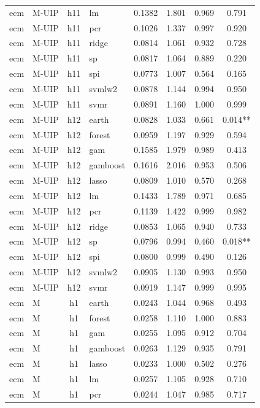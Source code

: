 \begin{ThreePartTable}
\begin{longtable}[t]{llclcccc}
ecm & M-UIP & h11 & lm & 0.1382 & 1.801 & 0.969 & 0.791\\
ecm & M-UIP & h11 & pcr & 0.1026 & 1.337 & 0.997 & 0.920\\
ecm & M-UIP & h11 & ridge & 0.0814 & 1.061 & 0.932 & 0.728\\
ecm & M-UIP & h11 & sp & 0.0817 & 1.064 & 0.889 & 0.220\\
ecm & M-UIP & h11 & spi & 0.0773 & 1.007 & 0.564 & 0.165\\
ecm & M-UIP & h11 & svmlw2 & 0.0878 & 1.144 & 0.994 & 0.950\\
ecm & M-UIP & h11 & svmr & 0.0891 & 1.160 & 1.000 & 0.999\\
\addlinespace
ecm & M-UIP & h12 & earth & 0.0828 & 1.033 & 0.661 & 0.014**\\
ecm & M-UIP & h12 & forest & 0.0959 & 1.197 & 0.929 & 0.594\\
ecm & M-UIP & h12 & gam & 0.1585 & 1.979 & 0.989 & 0.413\\
ecm & M-UIP & h12 & gamboost & 0.1616 & 2.016 & 0.953 & 0.506\\
ecm & M-UIP & h12 & lasso & 0.0809 & 1.010 & 0.570 & 0.268\\
ecm & M-UIP & h12 & lm & 0.1433 & 1.789 & 0.971 & 0.685\\
ecm & M-UIP & h12 & pcr & 0.1139 & 1.422 & 0.999 & 0.982\\
ecm & M-UIP & h12 & ridge & 0.0853 & 1.065 & 0.940 & 0.733\\
ecm & M-UIP & h12 & sp & 0.0796 & 0.994 & 0.460 & 0.018**\\
ecm & M-UIP & h12 & spi & 0.0800 & 0.999 & 0.490 & 0.126\\
ecm & M-UIP & h12 & svmlw2 & 0.0905 & 1.130 & 0.993 & 0.950\\
ecm & M-UIP & h12 & svmr & 0.0919 & 1.147 & 0.999 & 0.995\\
\addlinespace
ecm & M & h1 & earth & 0.0243 & 1.044 & 0.968 & 0.493\\
ecm & M & h1 & forest & 0.0258 & 1.110 & 1.000 & 0.883\\
ecm & M & h1 & gam & 0.0255 & 1.095 & 0.912 & 0.704\\
ecm & M & h1 & gamboost & 0.0263 & 1.129 & 0.935 & 0.791\\
ecm & M & h1 & lasso & 0.0233 & 1.000 & 0.502 & 0.276\\
ecm & M & h1 & lm & 0.0257 & 1.105 & 0.928 & 0.710\\
ecm & M & h1 & pcr & 0.0244 & 1.047 & 0.985 & 0.717\\

\end{longtable}
\end{ThreePartTable}
